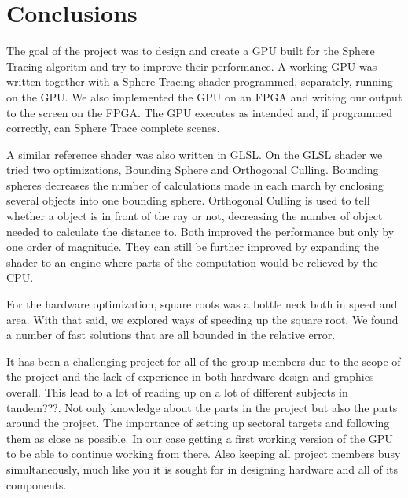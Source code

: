 \chapter{Conclusions}

	The goal of the project was to design and create a GPU built for the
	Sphere Tracing algoritm and try to improve their performance. A
	working GPU was written together with a Sphere Tracing shader
	programmed, separately, running on the GPU. We also implemented the
	GPU on an FPGA and writing our output to the screen on the FPGA. The
	GPU executes as intended and, if programmed correctly, can Sphere
	Trace complete scenes.
	
	A similar reference shader was also written in GLSL. On the GLSL
	shader we tried two optimizations, Bounding Sphere and Orthogonal
	Culling. Bounding spheres decreases the number of calculations made
	in each march by enclosing several objects into one bounding sphere.
	Orthogonal Culling is used to tell whether a object is in front of
	the ray or not, decreasing the number of object needed to calculate
	the distance to. Both improved the performance but only by one order
	of magnitude. They can still be further improved by expanding the
	shader to an engine where parts of the computation would be relieved
	by the CPU.
	
	For the hardware optimization, square roots was a bottle neck both in
	speed and area. With that said, we explored ways of speeding up the
	square root. We found a number of fast solutions that are all bounded
	in the relative error.
	
	It has been a challenging project for all of the group members due to
	the scope of the project and the lack of experience in both hardware
	design and graphics overall. This lead to a lot of reading up on a lot
	of different subjects in tandem???. Not only knowledge about the parts in
	the project but also the parts around the project. The importance of
	setting up sectoral targets and following them as close as possible.
	In our case getting a first working version of the GPU to be able to
	continue working from there. Also keeping all project members busy
	simultaneously, much like you it is sought for in designing hardware
	and all of its components.

